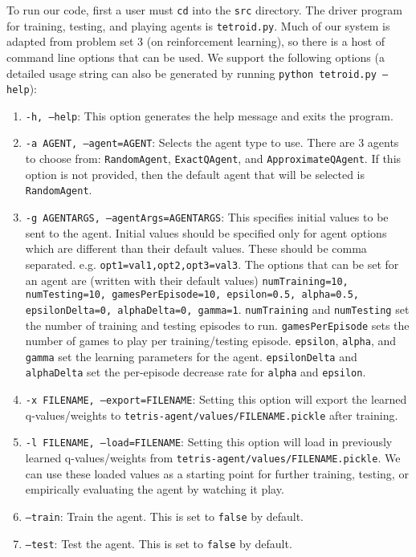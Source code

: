 \documentclass[11pt]{article}
\begin{document}
To run our code, first a user must \texttt{cd} into the \texttt{src} directory. The driver program for training, testing, and playing agents is \texttt{tetroid.py}. Much of our system is adapted from problem set 3 (on reinforcement learning), so there is a host of command line options that can be used. We support the following options (a detailed usage string can also be generated by running \texttt{python tetroid.py --help}):
\begin{enumerate}
    \item \texttt{-h, --help}: This option generates the help message and exits the program.
    \item \texttt{-a AGENT, --agent=AGENT}: Selects the agent type to use. There are 3 agents to choose from: \texttt{RandomAgent}, \texttt{ExactQAgent}, and \texttt{ApproximateQAgent}. If this option is not provided, then the default agent that will be selected is \texttt{RandomAgent}.
    \item \texttt{-g AGENTARGS, --agentArgs=AGENTARGS}: This specifies initial values to be sent to the agent. Initial values should be specified only for agent options which are different than their default values. These should be comma separated. e.g. \texttt{opt1=val1,opt2,opt3=val3}. The options that can be set for an agent are (written with their default values) \texttt{numTraining=10, numTesting=10, gamesPerEpisode=10, epsilon=0.5, alpha=0.5, epsilonDelta=0, alphaDelta=0, gamma=1}. \texttt{numTraining} and \texttt{numTesting} set the number of training and testing episodes to run. \texttt{gamesPerEpisode} sets the number of games to play per training/testing episode. \texttt{epsilon}, \texttt{alpha}, and \texttt{gamma} set the learning parameters for the agent. \texttt{epsilonDelta} and \texttt{alphaDelta} set the per-episode decrease rate for \texttt{alpha} and \texttt{epsilon}.
    \item \texttt{-x FILENAME, --export=FILENAME}: Setting this option will export the learned q-values/weights to \texttt{tetris-agent/values/FILENAME.pickle} after training.
    \item \texttt{-l FILENAME, --load=FILENAME}: Setting this option will load in previously learned q-values/weights from \texttt{tetris-agent/values/FILENAME.pickle}. We can use these loaded values as a starting point for further training, testing, or empirically evaluating the agent by watching it play.
    \item \texttt{--train}: Train the agent. This is set to \texttt{false} by default.
    \item \texttt{--test}: Test the agent. This is set to \texttt{false} by default.

\end{enumerate}
\end{document}
